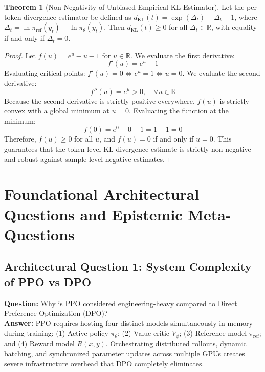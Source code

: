 \documentclass[11pt,a4paper]{article}
\theoremstyle{definition}
\newtheorem{theorem}{\textbf{Theorem}}[section]
\begin{document}
\begin{theorem}[Non-Negativity of Unbiased Empirical KL Estimator]
Let the per-token divergence estimator be defined as $d_{\text{KL}}(t) = \exp(\Delta_t) - \Delta_t - 1$, where $\Delta_t = \ln \pi_{\text{ref}}(y_t) - \ln \pi_\theta(y_t)$. Then $d_{\text{KL}}(t) \ge 0$ for all $\Delta_t \in \mathbb{R}$, with equality if and only if $\Delta_t = 0$.
\end{theorem}

\begin{proof}
Let $f(u) = e^u - u - 1$ for $u \in \mathbb{R}$.
We evaluate the first derivative:
{\boldmath
\begin{equation}
f'(u) = e^u - 1
\end{equation}
}
Evaluating critical points: $f'(u) = 0 \iff e^u = 1 \iff u = 0$.
We evaluate the second derivative:
{\boldmath
\begin{equation}
f''(u) = e^u > 0, \quad \forall u \in \mathbb{R}
\end{equation}
}
Because the second derivative is strictly positive everywhere, $f(u)$ is strictly convex with a global minimum at $u = 0$.
Evaluating the function at the minimum:
{\boldmath
\begin{equation}
f(0) = e^0 - 0 - 1 = 1 - 1 = 0
\end{equation}
}
Therefore, $f(u) \ge 0$ for all $u$, and $f(u) = 0$ if and only if $u = 0$.
This guarantees that the token-level KL divergence estimate is strictly non-negative and robust against sample-level negative estimates.
\end{proof}

\section{Foundational Architectural Questions and Epistemic Meta-Questions}

\subsection{Architectural Question 1: System Complexity of PPO vs DPO}
\textbf{Question:} Why is PPO considered engineering-heavy compared to Direct Preference Optimization (DPO)?\\
\textbf{Answer:} PPO requires hosting four distinct models simultaneously in memory during training: (1) Active policy $\pi_\theta$; (2) Value critic $V_\phi$; (3) Reference model $\pi_{\text{ref}}$; and (4) Reward model $R(x, y)$. Orchestrating distributed rollouts, dynamic batching, and synchronized parameter updates across multiple GPUs creates severe infrastructure overhead that DPO completely eliminates.
\end{document}
